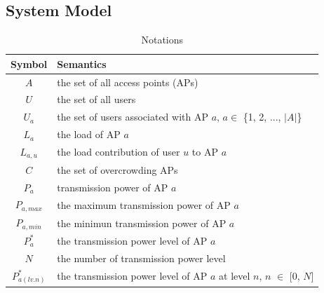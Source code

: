 

\subsection{System Model}\label{section:3.1}

\begin{table}[tbp] 
    \normalsize
    \caption{Notations} 
    \begin{center} 
        \label{tab: Notations} 
        \begin{tabularx}{\linewidth}{| c | X | } 
            \hline \textbf{Symbol}  & \textbf{Semantics} \\ 
            \hline $A$              & the set of all access points (APs) \\ 
            \hline $U$              & the set of all users \\ 
            \hline $U_a$            & the set of users associated with AP $a$, $a \in$ \{1, 2, ..., $|A|$\} \\ 
            \hline $L_a$            & the load of AP $a$ \\ 
            \hline $L_{a,u}$        & the load contribution of user $u$ to AP $a$ \\ 
            \hline $C$              & the set of overcrowding APs \\ 
            \hline $P_a$            & transmission power of AP $a$\\ 
            \hline $P_{a, max}$     & the maximum transmission power of AP $a$\\
            \hline $P_{a, min}$     & the minimun transmission power of AP $a$\\
            \hline $P^{*}_{a}$      & the transmission power level of AP $a$\\
            \hline $N$              & the number of transmission power level\\
            \hline $P^{*}_{a(lv.n)}$   & the transmission power level of AP $a$ at level $n$, $n$ $\in$ $[$0, $N]$\\

\end{tabularx}
\end{center}
\end{table}
